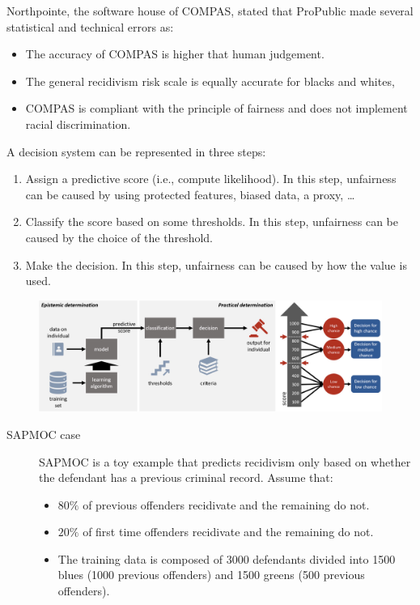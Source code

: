 \begin{example}
\begin{description}
            Northpointe, the software house of COMPAS, stated that ProPublic made several statistical and technical errors as:
            \begin{itemize}
                \item The accuracy of COMPAS is higher that human judgement.
                \item The general recidivism risk scale is equally accurate for blacks and whites,
                \item COMPAS is compliant with the principle of fairness and does not implement racial discrimination.
            \end{itemize}
    \end{description}

    \indenttbox
    \begin{remark}
        A decision system can be represented in three steps:
        \begin{enumerate}
            \item Assign a predictive score (i.e., compute likelihood). In this step, unfairness can be caused by using protected features, biased data, a proxy, \dots
            \item Classify the score based on some thresholds. In this step, unfairness can be caused by the choice of the threshold.
            \item Make the decision. In this step, unfairness can be caused by how the value is used.
        \end{enumerate}
        \begin{figure}[H]
            \centering
            \includegraphics[width=0.8\linewidth]{./img/decision_anatomy.png}
        \end{figure}
    \end{remark}

    \begin{description}
        \item[SAPMOC case]
            SAPMOC is a toy example that predicts recidivism only based on whether the defendant has a previous criminal record. Assume that:
            \begin{itemize}
                \item $80\%$ of previous offenders recidivate and the remaining do not.
                \item $20\%$ of first time offenders recidivate and the remaining do not.
                \item The training data is composed of 3000 defendants divided into 1500 blues (1000 previous offenders) and 1500 greens (500 previous offenders).
            \end{itemize}


\end{description}
\end{example}
